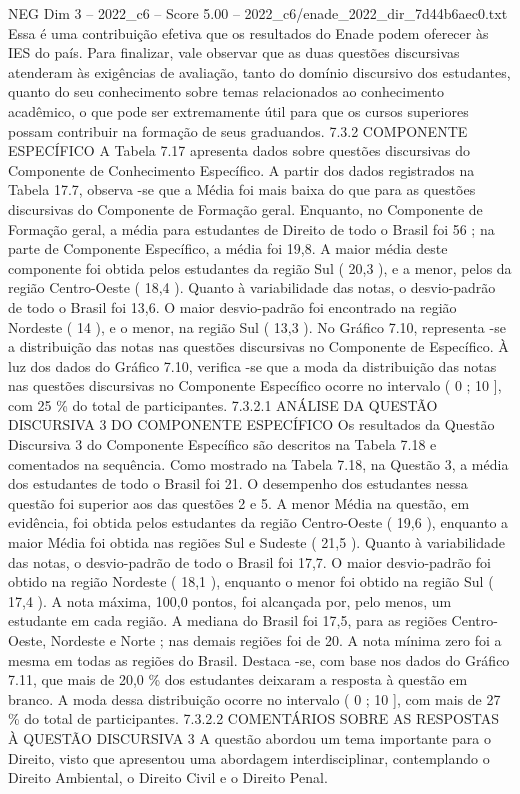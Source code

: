 \begin{textsample}{NEG Dim 3 – 2022\_c6 – Score 5.00 – 2022\_c6/enade\_2022\_dir\_7d44b6aec0.txt}
Essa é uma contribuição efetiva que os resultados do Enade podem oferecer às IES do país.
Para finalizar, vale observar que as duas questões discursivas atenderam às exigências de avaliação, tanto do domínio discursivo dos estudantes, quanto do seu conhecimento sobre temas relacionados ao conhecimento acadêmico, o que pode ser extremamente útil para que os cursos superiores possam contribuir na formação de seus graduandos. 7.3.2 COMPONENTE ESPECÍFICO A Tabela 7.17 apresenta dados sobre questões discursivas do Componente de Conhecimento Específico.
A partir dos dados registrados na Tabela 17.7, observa -se que a Média foi mais baixa do que para as questões discursivas do Componente de Formação geral.
Enquanto, no Componente de Formação geral, a média para estudantes de Direito de todo o Brasil foi 56 ; na parte de Componente Específico, a média foi 19,8.
A maior média deste componente foi obtida pelos estudantes da região Sul ( 20,3 ), e a menor, pelos da região Centro-Oeste ( 18,4 ).
Quanto à variabilidade das notas, o desvio-padrão de todo o Brasil foi 13,6.
O maior desvio-padrão foi encontrado na região Nordeste ( 14 ), e o menor, na região Sul ( 13,3 ).
No Gráfico 7.10, representa -se a distribuição das notas nas questões discursivas no Componente de Específico.
À luz dos dados do Gráfico 7.10, verifica -se que a moda da distribuição das notas nas questões discursivas no Componente Específico ocorre no intervalo ( 0 ; 10 ], com 25 \% do total de participantes. 7.3.2.1 ANÁLISE DA QUESTÃO DISCURSIVA 3 DO COMPONENTE ESPECÍFICO Os resultados da Questão Discursiva 3 do Componente Específico são descritos na Tabela 7.18 e comentados na sequência.
Como mostrado na Tabela 7.18, na Questão 3, a média dos estudantes de todo o Brasil foi 21.
O desempenho dos estudantes nessa questão foi superior aos das questões 2 e 5.
A menor Média na questão, em evidência, foi obtida pelos estudantes da região Centro-Oeste ( 19,6 ), enquanto a maior Média foi obtida nas regiões Sul e Sudeste ( 21,5 ).
Quanto à variabilidade das notas, o desvio-padrão de todo o Brasil foi 17,7.
O maior desvio-padrão foi obtido na região Nordeste ( 18,1 ), enquanto o menor foi obtido na região Sul ( 17,4 ).
A nota máxima, 100,0 pontos, foi alcançada por, pelo menos, um estudante em cada região.
A mediana do Brasil foi 17,5, para as regiões Centro-Oeste, Nordeste e Norte ; nas demais regiões foi de 20.
A nota mínima zero foi a mesma em todas as regiões do Brasil.
Destaca -se, com base nos dados do Gráfico 7.11, que mais de 20,0 \% dos estudantes deixaram a resposta à questão em branco.
A moda dessa distribuição ocorre no intervalo ( 0 ; 10 ], com mais de 27 \% do total de participantes. 7.3.2.2 COMENTÁRIOS SOBRE AS RESPOSTAS À QUESTÃO DISCURSIVA 3 A questão abordou um tema importante para o Direito, visto que apresentou uma abordagem interdisciplinar, contemplando o Direito Ambiental, o Direito Civil e o Direito Penal.

\end{textsample}
